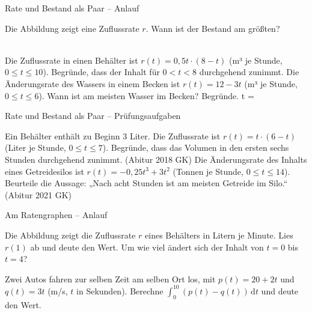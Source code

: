 \begin{aufgabe}{Rate und Bestand als Paar – Anlauf}
\begin{teile}
\teil Die Abbildung zeigt eine Zuflussrate $r$. Wann ist der Bestand am größten? \\  \\ 

\begin{ksys}[xmin=0,xmax=8,ymin=-3,ymax=2,xlabel=t,ylabel=r,ablesen]  \end{ksys}
\teil Die Zuflussrate in einen Behälter ist $r(t) = 0{,}5t \cdot (8 - t)$ (m³ je Stunde, $0 \le t \le 10$). Begründe, dass der Inhalt für $0 < t < 8$ durchgehend zunimmt.
\teil Die Änderungsrate des Wassers in einem Becken ist $r(t) = 12 - 3t$ (m³ je Stunde, $0 \le t \le 6$). Wann ist am meisten Wasser im Becken? Begründe. t = \leerfeld
\end{teile}
\end{aufgabe}

\begin{aufgabe}{Rate und Bestand als Paar – Prüfungsaufgaben}
\begin{teile}
\teil Ein Behälter enthält zu Beginn 3 Liter. Die Zuflussrate ist $r(t) = t \cdot (6 - t)$ (Liter je Stunde, $0 \le t \le 7$). Begründe, dass das Volumen in den ersten sechs Stunden durchgehend zunimmt. \hfill (Abitur 2018 GK)
\teil Die Änderungsrate des Inhalts eines Getreidesilos ist $r(t) = -0{,}25t^3 + 3t^2$ (Tonnen je Stunde, $0 \le t \le 14$). Beurteile die Aussage: „Nach acht Stunden ist am meisten Getreide im Silo.“ \hfill (Abitur 2021 GK)
\end{teile}
\end{aufgabe}

\begin{aufgabe}{Am Ratengraphen – Anlauf}
\begin{teile}
\teil Die Abbildung zeigt die Zuflussrate $r$ eines Behälters in Litern je Minute. Lies $r(1)$ ab und deute den Wert. Um wie viel ändert sich der Inhalt von $t = 0$ bis $t = 4$?

\begin{ksys}[xmin=0,xmax=7,ymin=-3,ymax=5,xlabel=t,ylabel=r,ablesen]  \end{ksys}
\teil Zwei Autos fahren zur selben Zeit am selben Ort los, mit $p(t) = 20 + 2t$ und $q(t) = 3t$ (m/s, $t$ in Sekunden). Berechne $∫_0^{10} (p(t) - q(t))\,\mathrm{d}t$ und deute den Wert.
\end{teile}
\end{aufgabe}

